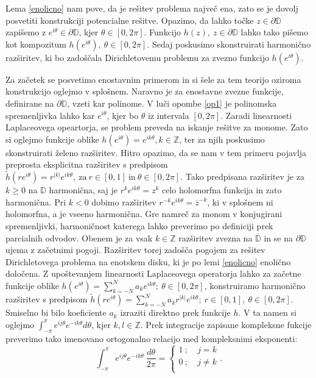 \documentclass[mat1]{fmfdelo}
\begin{document}
    \begin{opomba}
        \label{op1}
        Lema \ref{enolicno} nam pove, da je rešitev problema največ ena, zato se je dovolj posvetiti konstrukciji potencialne rešitve. 
        Opazimo, da lahko točke $z \in \partial \mathbb{D}$ zapišemo z $e^{i \theta} \in \partial \mathbb{D}$, kjer $\theta \in [0,2\pi]$. Funkcijo $h(z),~z \in \partial \mathbb{D}$ lahko tako pišemo kot kompozitum $h(e^{i \theta}),~\theta \in [0,2\pi]$.
        Sedaj poskusimo skonstruirati harmonično razširitev, ki bo zadoščala Dirichletovemu problemu za zvezno funkcijo $h(e^{i \theta})$.
    \end{opomba}

    Za začetek se posvetimo enostavnim primerom in si šele za tem teorijo oziroma konstrukcijo oglejmo v splošnem. 
    Naravno je za enostavne zvezne funkcije, definirane na $\partial \mathbb{D}$, vzeti kar polinome. V luči opombe \ref{op1} je polinomska spremenljivka lahko kar $e^{i\theta}$, kjer bo $\theta$ iz intervala $[0,2\pi]$. 
    Zaradi linearnosti Laplaceovega opeartorja, se problem preveda na iskanje rešitve za monome. 
    Zato si oglejmo funkcije oblike $h(e^{i \theta}) = e^{i k \theta}, k \in \mathbb{Z}$, ter za njih poskusimo skonstruirati želeno razširitev. 
    Hitro opazimo, da se nam v tem primeru pojavlja preprosta eksplicitna razširitev s predpisom $\widetilde{h}(r e^{i \theta}) = r^{|k|}e^{i k \theta},~\text{za}~r\in [0, 1]~\text{in}~\theta \in [0, 2\pi]$. 
    Tako predpisana razširitev je za $k \geq 0$ na $\mathbb{D}$ harmonična, saj je $r^k e^{ik\theta} = z^k$ celo holomorfna funkcija in zato harmonična. Pri $k < 0$ dobimo razširitev $r^{-k} e^{ik\theta} = \overline{z}^{-k}$, ki v splošnem ni holomorfna, a je vseeno harmonična. 
    Gre namreč za monom v konjugirani spremenljivki, harmoničnost katerega lahko preverimo po definiciji prek parcialnih odvodov.
    Obenem je za vsak $k \in \mathbb{Z}$ razširitev zvezna na $\overline{\mathbb{D}}$ in se na $\partial \mathbb{D}$ ujema z začetnimi pogoji. Razširitev torej zadošča pogojem za rešitev Dirichletovega problema na enotskem disku, ki je po lemi \ref{enolicno} enolično določena. 
    Z upoštevanjem linearnosti Laplaceovega operatorja lahko za začetne funkcije oblike $h(e^{i\theta}) = \sum_{k = -N}^{N}{a_k e^{ik\theta}};~\theta \in [0,2\pi]$, konstruiramo harmonično razširitev s predpisom
    $\widetilde{h}(r e^{i \theta}) = \sum_{k = -N}^{N}{a_k r^{|k|}e^{ik\theta}};~r \in [0,1],~\theta \in [0,2\pi]$. Smiselno bi bilo koeficiente $a_k$ izraziti direktno prek funkcije $h$. 
    V ta namen si oglejmo $\int_{-\pi}^{\pi}{e^{ij\theta} e^{-ik\theta}d\theta}$, kjer $k,l \in \mathbb{Z}$. Prek integracije zapisane kompleksne fukcije preverimo tako imenovano ortogonalno relacijo med kompleksnimi eksponenti:
        $$
        \int_{-\pi}^{\pi}{e^{ij\theta} e^{-ik\theta}~\frac{d\theta}{2\pi}} = 
        \begin{cases}
            1~;~&j=k\\
            0~;~&j \neq k\\
        \end{cases}
        .$$
\end{document}
